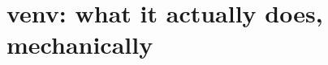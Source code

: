 \chapter{venv: what it actually does, mechanically}
\label{ch:venv-what-it-actually-does-mechanically}

